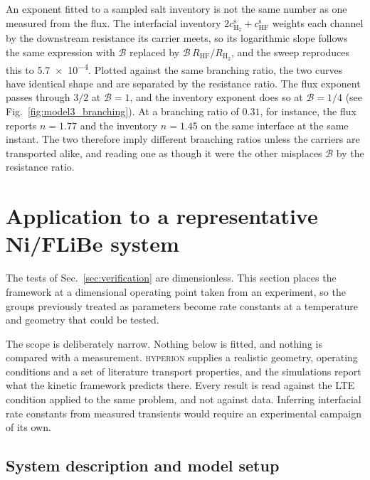 \documentclass[5p]{elsarticle}
\newcommand{\HYPERION}{\textsc{hyperion}}
\newcommand{\cs}[1]{c^{\mathrm{s}}_{#1}}   %
\newcommand{\Bra}{\mathcal{B}}             %
\begin{document}
An exponent fitted to a sampled salt inventory is not the same number as one measured from the flux.
The interfacial inventory $2\cs{\mathrm{H_2}} + \cs{\mathrm{HF}}$ weights each channel by the downstream resistance its carrier meets, so its logarithmic slope follows the same expression with $\Bra$ replaced by $\Bra\,R_\mathrm{HF}/R_\mathrm{H_2}$, and the sweep reproduces this to \num{5.7e-4}.
Plotted against the same branching ratio, the two curves have identical shape and are separated by the resistance ratio.
The flux exponent passes through $3/2$ at $\Bra = 1$, and the inventory exponent does so at $\Bra = 1/4$ (see Fig.~\ref{fig:model3_branching}).
At a branching ratio of $0.31$, for instance, the flux reports $n = 1.77$ and the inventory $n = 1.45$ on the same interface at the same instant.
The two therefore imply different branching ratios unless the carriers are transported alike, and reading one as though it were the other misplaces $\Bra$ by the resistance ratio.

\section{Application to a representative Ni/FLiBe system}
\label{sec:hyperion}

The tests of Sec.~\ref{sec:verification} are dimensionless.
This section places the framework at a dimensional operating point taken from an experiment, so the groups previously treated as parameters become rate constants at a temperature and geometry that could be tested.

The scope is deliberately narrow. 
Nothing below is fitted, and nothing is compared with a measurement.
\HYPERION{} supplies a realistic geometry, operating conditions and a set of literature transport properties, and the simulations report what the kinetic framework predicts there.
Every result is read against the LTE condition applied to the same problem, and not against data.
Inferring interfacial rate constants from measured transients would require an experimental campaign of its own.

\subsection{System description and model setup}
\label{sec:hyperion_setup}
\end{document}
